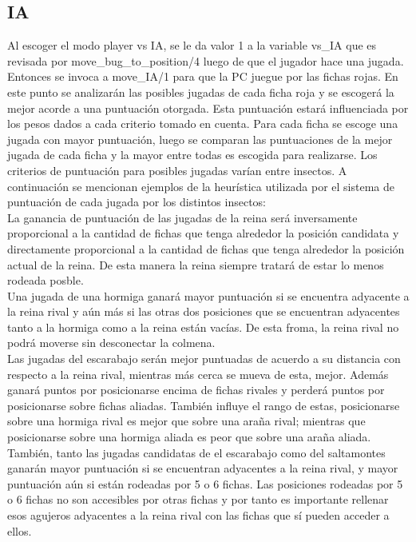 \documentclass[a4paper,12pt]{article}
\begin{document}
\subsection*{IA}
Al escoger el modo player vs IA, se le da valor 1 a la variable vs\_IA que es revisada por move\_bug\_to\_position/4 luego de que el jugador hace una jugada. Entonces se invoca a move\_IA/1 para que la PC juegue por las fichas rojas. En este punto se analizarán las posibles jugadas de cada ficha roja y se escogerá la mejor acorde a una puntuación otorgada. Esta puntuación estará influenciada por los pesos dados a cada criterio tomado en cuenta. Para cada ficha se escoge una jugada con mayor puntuación, luego se comparan las puntuaciones de la mejor jugada de cada ficha y la mayor entre todas es escogida para realizarse. Los criterios de puntuación para posibles jugadas varían entre insectos. A continuación se mencionan ejemplos de la heurística utilizada por el sistema de puntuación de cada jugada por los distintos insectos:\\
La ganancia de puntuación de las jugadas de la reina será inversamente proporcional a la cantidad de fichas que tenga alrededor la posición candidata y directamente proporcional a la cantidad de fichas que tenga alrededor la posición actual de la reina. De esta manera la reina siempre tratará de estar lo menos rodeada posble.\\
Una jugada de una hormiga ganará mayor puntuación si se encuentra adyacente a la reina rival y aún más si las otras dos posiciones que se encuentran adyacentes tanto a la hormiga como a la reina están vacías. De esta froma, la reina rival no podrá moverse sin desconectar la colmena.\\
Las jugadas del escarabajo serán mejor puntuadas de acuerdo a su distancia con respecto a la reina rival, mientras más cerca se mueva de esta, mejor. Además ganará puntos por posicionarse encima de fichas rivales y perderá puntos por posicionarse sobre fichas aliadas. También influye el rango de estas, posicionarse sobre una hormiga rival es mejor que sobre una araña rival; mientras que posicionarse sobre una hormiga aliada es peor que sobre una araña aliada.\\
También, tanto las jugadas candidatas de el escarabajo como del saltamontes ganarán mayor puntuación si se encuentran adyacentes a la reina rival, y mayor puntuación aún si están rodeadas por 5 o 6 fichas. Las posiciones rodeadas por 5 o 6 fichas no son accesibles por otras fichas y por tanto es importante rellenar esos agujeros adyacentes a la reina rival con las fichas que sí pueden acceder a ellos.\\
\end{document}
